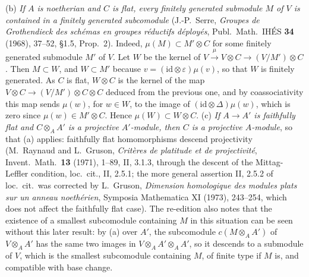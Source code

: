 (b) \emph{If \(A\) is noetherian and \(C\) is flat, every finitely generated submodule \(M\) of \(V\) is contained in a
finitely generated subcomodule} (J.-P.~Serre, \emph{Groupes de Grothendieck des sch\'emas en groupes r\'eductifs
d\'eploy\'es}, Publ.\ Math.\ IH\'ES \textbf{34} (1968), 37--52, \S1.5, Prop.~2). Indeed, \(\mu(M)\subset M'\otimes C\)
for some finitely generated submodule \(M'\) of \(V\). Let \(W\) be the kernel of
\(V\xrightarrow{\mu}V\otimes C\to(V/M')\otimes C\). Then \(M\subset W\), and \(W\subset M'\) because
\(v=(\mathrm{id}\otimes\varepsilon)\mu(v)\), so that \(W\) is finitely generated. As \(C\) is flat, \(W\otimes C\) is
the kernel of the map \(V\otimes C\to(V/M')\otimes C\otimes C\) deduced from the previous one, and by
coassociativity this map sends \(\mu(w)\), for \(w\in W\), to the image of \((\mathrm{id}\otimes\Delta)\mu(w)\), which
is zero since \(\mu(w)\in M'\otimes C\). Hence \(\mu(W)\subset W\otimes C\).
(c) \emph{If \(A\to A'\) is faithfully flat and \(C\otimes_AA'\) is a projective \(A'\)-module, then \(C\) is a
projective \(A\)-module}, so that (a) applies: faithfully flat homomorphisms descend projectivity (M.~Raynaud and
L.~Gruson, \emph{Crit\`eres de platitude et de projectivit\'e}, Invent.\ Math.\ \textbf{13} (1971), 1--89, II, 3.1.3,
through the descent of the Mittag-Leffler condition, loc.\ cit., II, 2.5.1; the more general assertion II, 2.5.2 of
loc.\ cit.\ was corrected by L.~Gruson, \emph{Dimension homologique des modules plats sur un anneau
noeth\'erien}, Symposia Mathematica XI (1973), 243--254, which does not affect the faithfully flat case). The
re-edition also notes that the existence of a smallest subcomodule containing \(M\) in this situation can be seen
without this later result: by (a) over \(A'\), the subcomodule \(c(M\otimes_AA')\) of \(V\otimes_AA'\) has the same
two images in \(V\otimes_AA'\otimes_AA'\), so it descends to a submodule of \(V\), which is the smallest subcomodule
containing \(M\), of finite type if \(M\) is, and compatible with base change.

